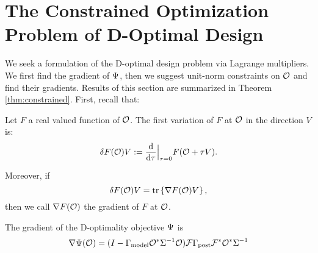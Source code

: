 \section{The Constrained Optimization Problem of D-Optimal Design}\label{section:D and grad}
We seek a formulation of the D-optimal design problem via Lagrange
multipliers. We first find the gradient of $\Psi$, then we suggest
unit-norm constraints on $\mathcal{O}$ and find their gradients. Results of
this section are summarized in Theorem \ref{thm:constrained}. First,
recall that:
\begin{definition}\label{def:var}
  Let $F$ a real valued function of $\mathcal{O}$. The first variation of $F$
  at $\mathcal{O}$ in the direction $V$ is:
  \begin{equation*}
    \delta F(\obs) V := \frac{\der}{\der \tau}\Big |_{\tau=0}  F( \obs + \tau V).
  \end{equation*}

  Moreover, if
  \begin{equation*}
    \delta F(\obs) V = \tr{\nabla F(\obs) V},
  \end{equation*}
  then we call $\nabla F(\mathcal{O})$ the gradient of $F$ at $\mathcal{O}$. 
\end{definition}




\begin{proposition}\label{prop:tar grad}
  The gradient of the D-optimality objective $\Psi$ is
  \begin{equation*}
    \nabla \tar(\obs) = ( I - \modcov \obs^* \Sigma^{-1}\obs ) \fwd
    \postcov \fwd^* \obs^* \Sigma^{-1}
  \end{equation*}
\end{proposition}

